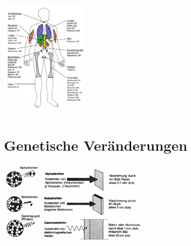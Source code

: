 \documentclass{beamer}
\begin{document}
\begin{frame}
    \begin{center}
        \includegraphics[height=6.0cm]{img/Bild_4b.png}\\
        \begin{block}{}
        \end{block}
    \end{center}
\end{frame}

\section{Genetische Veränderungen}

\begin{frame}
    \begin{center}
        \includegraphics[width=7.5cm]{img/Bild_5.png}\\
        \begin{block}{}
        \end{block}
    \end{center}
\end{frame}
\end{document}
